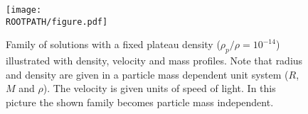 \begin{figure}%
	\centering%
	\texttt{[image: \\ROOTPATH/figure.pdf]}
	\caption{Family of solutions with a fixed plateau density ($\rho_p/\rho = 10^{-14}$) illustrated with density, velocity and mass profiles. Note that radius and density are given in a particle mass dependent unit system ($R$, $M$ and $\rho$). The velocity is given units of speed of light. In this picture the shown family becomes particle mass independent.}%
	\label{fig:profiles:without-cutoff:plateau-density:raw}%
\end{figure}